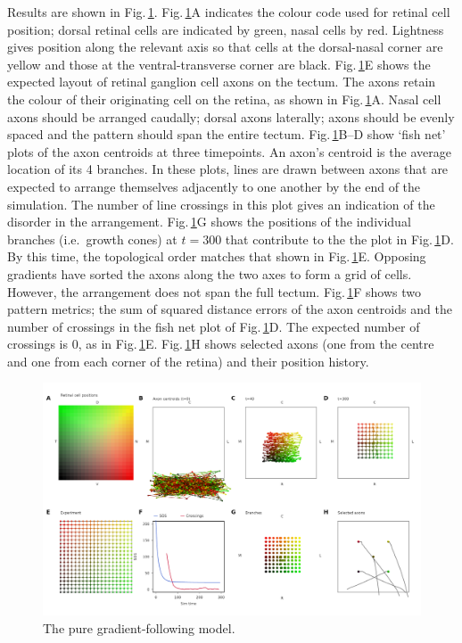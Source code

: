 \documentclass[11pt, a4paper]{article}
\begin{document}
Results are shown in Fig.\,\ref{f:ch}. Fig.\,\ref{f:ch}A indicates the colour
code used for retinal cell position; dorsal retinal cells are indicated by
green, nasal cells by red. Lightness gives position along the relevant axis so
that cells at the dorsal-nasal corner are yellow and those at the
ventral-transverse corner are black. Fig.\,\ref{f:ch}E shows the expected
layout of retinal ganglion cell axons on the tectum. The axons retain the
colour of their originating cell on the retina, as shown in
Fig.\,\ref{f:ch}A. Nasal cell axons should be arranged caudally; dorsal axons
laterally; axons should be evenly spaced and the pattern should span the
entire tectum.  Fig.\,\ref{f:ch}B--D show `fish net' plots of the axon
centroids at three timepoints. An axon's centroid is the average location of
its 4 branches. In these plots, lines are drawn between axons that are
expected to arrange themselves adjacently to one another by the end of the
simulation. The number of line crossings in this plot gives an indication of
the disorder in the arrangement. Fig.\,\ref{f:ch}G shows the positions of the
individual branches (i.e.~growth cones) at $t=300$ that contribute to the the
plot in Fig.\,\ref{f:ch}D. By this time, the topological order matches that
shown in Fig.\,\ref{f:ch}E. Opposing gradients have sorted the axons along the
two axes to form a grid of cells. However, the arrangement does not span the
full tectum. Fig.\,\ref{f:ch}F shows two pattern metrics; the sum of squared
distance errors of the axon centroids and the number of crossings in the fish
net plot of Fig.\,\ref{f:ch}D. The expected number of crossings is 0, as in
Fig.\,\ref{f:ch}E. Fig.\,\ref{f:ch}H shows selected axons (one from the centre
and one from each corner of the retina) and their position history.

\begin{figure}
\includegraphics[width=\linewidth]{./images/j4_ee_G_wt_fig2.png}
\caption{The pure gradient-following model.}
\label{f:ch}
\end{figure}
\end{document}
